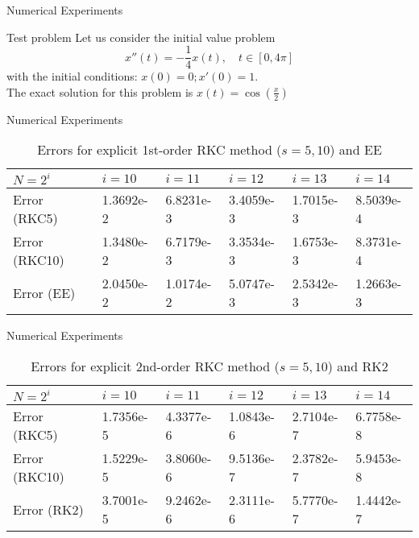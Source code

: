 \documentclass{beamer}
\begin{document}
\begin{frame}{Numerical Experiments}
\begin{block}{Test problem}
Let us consider the initial value problem
$$x''(t)=-\frac{1}{4}x(t), \quad t \in \left[0,4 \pi\right]$$
with the initial conditions: $x(0)=0; x'(0)=1$.\\
The exact solution for this problem is $x(t)=\cos(\frac{x}{2})$
\end{block}
\end{frame}
\begin{frame}{Numerical Experiments}
	\begin{table}	
		\begin{tabular}{ | m{1.5cm} | m{1.5cm}|  m{1.5cm}| m{1.5cm}| m{1.5cm}| m{1.5cm}|  }
			\hline
			$N=2^i$ & $i=10$ &  $i=11$ & $i=12$ & $i=13$ &  $i=14$  \\ 
			\hline
			Error (RKC5) & 1.3692e-2  & 6.8231e-3 & 3.4059e-3 & 1.7015e-3 & 8.5039e-4 \\
			\hline
			Error (RKC10) & 1.3480e-2  & 6.7179e-3 & 3.3534e-3 & 1.6753e-3 & 8.3731e-4 \\
			\hline
			Error (EE) &2.0450e-2 &1.0174e-2 &5.0747e-3 &2.5342e-3 & 1.2663e-3 \\
			\hline		
		\end{tabular}		
		\caption{Errors for explicit 1st-order RKC method ($s=5,10$) and EE }
	\end{table}	
	

	
\end{frame}
\begin{frame}{Numerical Experiments}
		\begin{table}	
		\begin{tabular}{ | m{1.5cm} | m{1.5cm}|  m{1.5cm}| m{1.5cm}| m{1.5cm}| m{1.5cm}|  }
			\hline
			$N=2^i$ & $i=10$ &  $i=11$ & $i=12$ & $i=13$ &  $i=14$  \\ 
			\hline
			Error (RKC5) & 1.7356e-5  & 4.3377e-6 & 1.0843e-6 & 2.7104e-7 & 6.7758e-8  \\
			\hline
			Error (RKC10) & 1.5229e-5  & 3.8060e-6 & 9.5136e-7 & 2.3782e-7 & 5.9453e-8  \\
			\hline
			Error (RK2) &3.7001e-5 &9.2462e-6 &2.3111e-6 &5.7770e-7 & 1.4442e-7 \\
			\hline
			
		\end{tabular}	
		\caption{Errors for explicit 2nd-order RKC method ($s=5,10$) and RK2 }
	\end{table}
\end{frame}
\end{document}
